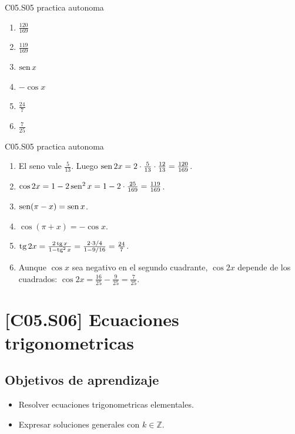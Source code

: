 \begin{shortanswer}{C05.S05 practica autonoma}
\begin{enumerate}[label=\textbf{PX-C05.S05-\arabic*:}, leftmargin=*]
  \item \(\frac{120}{169}\)
  \item \(\frac{119}{169}\)
  \item \(\operatorname{sen} x\)
  \item \(-\cos x\)
  \item \(\frac{24}{7}\)
  \item \(\frac{7}{25}\)
\end{enumerate}
\end{shortanswer}

\begin{fullsolution}{C05.S05 practica autonoma}
\begin{enumerate}[label=\textbf{PX-C05.S05-\arabic*:}, leftmargin=*]
  \item El seno vale \(\frac{5}{13}\). Luego \(\operatorname{sen} 2x=2\cdot \frac{5}{13}\cdot \frac{12}{13}=\frac{120}{169}\).
  \item \(\cos 2x=1-2\operatorname{sen}^2 x=1-2\cdot \frac{25}{169}=\frac{119}{169}\).
  \item \(\operatorname{sen}(\pi-x)=\operatorname{sen} x\).
  \item \(\cos(\pi+x)=-\cos x\).
  \item \(\operatorname{tg} 2x=\frac{2\operatorname{tg} x}{1-\operatorname{tg}^2 x}=\frac{2\cdot 3/4}{1-9/16}=\frac{24}{7}\).
  \item Aunque \(\cos x\) sea negativo en el segundo cuadrante, \(\cos 2x\) depende de los cuadrados:
  \(\cos 2x=\frac{16}{25}-\frac{9}{25}=\frac{7}{25}\).
\end{enumerate}
\end{fullsolution}

\section{[C05.S06] Ecuaciones trigonometricas}

\subsection*{Objetivos de aprendizaje}
\begin{itemize}
  \item Resolver ecuaciones trigonometricas elementales.
  \item Expresar soluciones generales con \(k\in\mathbb{Z}\).
\end{itemize}

